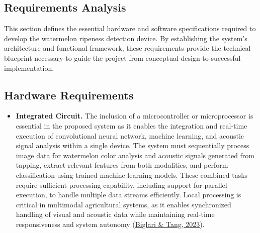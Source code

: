 \begin{thesisprose}
\section{Requirements Analysis}

This section defines the essential hardware and software specifications required to develop the watermelon ripeness detection device. By establishing the system’s architecture and functional framework, these requirements provide the technical blueprint necessary to guide the project from conceptual design to successful implementation.

\subsection{Hardware Requirements}

\begin{itemize}

\item \textbf{Integrated Circuit.} The inclusion of a microcontroller or microprocessor is essential in the proposed system as it enables the integration and real-time execution of convolutional neural network, machine learning, and acoustic signal analysis within a single device. The system must sequentially process image data for watermelon color analysis and acoustic signals generated from tapping, extract relevant features from both modalities, and perform classification using trained machine learning models. These combined tasks require sufficient processing capability, including support for parallel execution, to handle multiple data streams efficiently. Local processing is critical in multimodal agricultural systems, as it enables synchronized handling of visual and acoustic data while maintaining real-time responsiveness and system autonomy (\hyperlink{cite.biglari2023}{Biglari \& Tang, 2023}).


\end{itemize}
\end{thesisprose}
